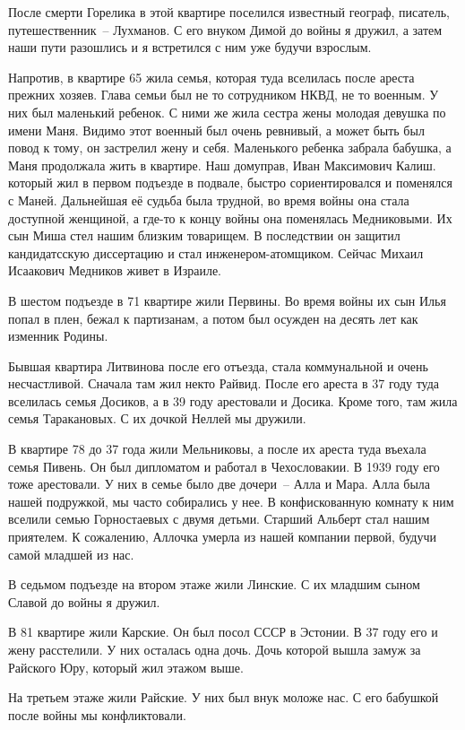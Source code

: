 После смерти Горелика в этой квартире поселился известный географ, писатель, путешественник~-- Лухманов.
С его внуком Димой до войны я дружил, а затем наши пути разошлись и я встретился с ним уже будучи взрослым.

Напротив, в квартире 65 жила семья, которая туда вселилась после ареста прежних хозяев. Глава семьи был не то сотрудником НКВД, не то военным. У них был маленький ребенок. С ними же жила сестра жены молодая девушка по имени Маня. Видимо этот военный был очень ревнивый, а может быть был повод к тому, он застрелил жену и себя. Маленького ребенка забрала бабушка, а Маня продолжала жить в квартире. Наш домуправ, Иван Максимович Калиш. который жил в первом подъезде в подвале, быстро сориентировался и поменялся с Маней. Дальнейшая её судьба была трудной, во время войны она стала доступной женщиной, а где-то к концу войны она поменялась Медниковыми. Их сын Миша стел нашим близким товарищем. В последствии он защитил кандидатсскую диссертацию и стал инженером-атомщиком. Сейчас Михаил Исаакович Медников живет в Израиле.

В шестом подъезде в 71 квартире жили Первины. Во время войны их сын Илья попал в плен, бежал к партизанам, а потом был осужден на десять лет как изменник Родины.

Бывшая квартира Литвинова после его отъезда, стала коммунальной и очень несчастливой. Сначала там жил некто Райвид. После его ареста в 37 году туда вселилась семья Досиков, а в 39 году арестовали и Досика. Кроме того, там жила семья Таракановых. С их дочкой Неллей мы дружили.

В квартире 78 до 37 года жили Мельниковы, а после их ареста туда въехала семья Пивень. Он был дипломатом и работал в Чехословакии. В 1939 году его тоже арестовали. У них в семье было две дочери~-- Алла и Мара. Алла была нашей подружкой, мы часто собирались у нее. В конфискованную комнату к ним вселили семью Горностаевых с двумя детьми. Старший Альберт стал нашим приятелем. К сожалению, Аллочка умерла из нашей компании первой, будучи самой младшей из нас.

В седьмом подъезде на втором этаже жили Линские. С их младшим сыном Славой до войны я дружил.

В 81 квартире жили Карские. Он был посол СССР в Эстонии. В 37 году его и жену расстелили. У них осталась одна дочь. Дочь которой вышла замуж за Райского Юру, который жил этажом выше.

На третьем этаже жили Райские. У них был внук моложе нас. С его бабушкой после войны мы конфликтовали.

